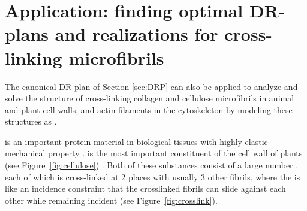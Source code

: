 \section{Application: finding optimal DR-plans and realizations for cross-linking microfibrils }
\label{sec:pinnedline}

The canonical DR-plan of Section \ref{sec:DRP} can also be applied to analyze and solve
the structure of  cross-linking collagen and cellulose microfibrils 
in animal and plant cell walls, and actin filaments in the cytoskeleton
by modeling these structures as .


 is an important protein material in biological tissues with highly elastic mechanical property \cite{buehler2008nanomechanics}.
 is the most important constituent of the cell wall of plants (see Figure~\ref{fig:cellulose}) \cite{fall2013physical,smith1971plant}.
Both of these substances consist of a large number ,
each of which is cross-linked at 2 places with usually 3 other fibrils,
where the  is like an incidence constraint that the
crosslinked fibrils can slide against each other while remaining incident (see
Figure~\ref{fig:crosslink}).

%
%
%
%
%
%


